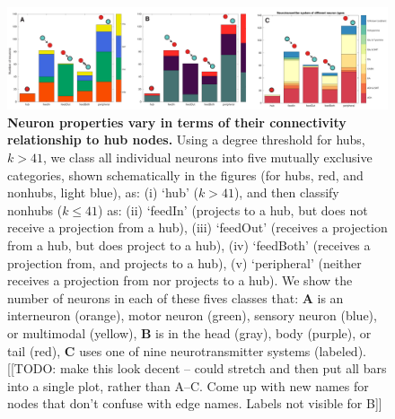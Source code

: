 \documentclass[10pt,letterpaper]{article}
\begin{document}
\begin{figure}[h]
\centering
    \includegraphics[width=1\textwidth]{FeedInOutNodes.pdf}
\caption{
\textbf{Neuron properties vary in terms of their connectivity relationship to hub nodes.}
Using a degree threshold for hubs, $k > 41$, we class all individual neurons into five mutually exclusive categories, shown schematically in the figures (for hubs, red, and nonhubs, light blue), as:
(i) `hub' ($k>41$),
and then classify nonhubs ($k\leq41$) as:
(ii) `feedIn' (projects to a hub, but does not receive a projection from a hub),
(iii) `feedOut' (receives a projection from a hub, but does project to a hub),
(iv) `feedBoth' (receives a projection from, and projects to a hub),
(v) `peripheral' (neither receives a projection from nor projects to a hub).
We show the number of neurons in each of these fives classes that:
\textbf{A} is an interneuron (orange), motor neuron (green), sensory neuron (blue), or multimodal (yellow),
\textbf{B} is in the head (gray), body (purple), or tail (red),
\textbf{C} uses one of nine neurotransmitter systems (labeled).
\label{fig:S_feedInOutNodes}
[[TODO: make this look decent -- could stretch and then put all bars into a single plot, rather than A--C. Come up with new names for nodes that don't confuse with edge names. Labels not visible for B]]
}
\end{figure}
\end{document}
